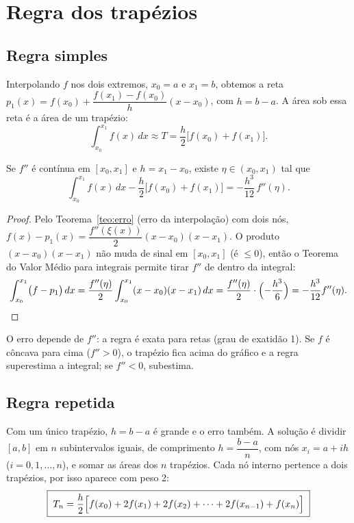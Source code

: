 \section{Regra dos trapézios}

\subsection{Regra simples}

Interpolando $f$ nos dois extremos, $x_0=a$ e $x_1=b$, obtemos a reta
$p_1(x)=f(x_0)+\dfrac{f(x_1)-f(x_0)}{h}(x-x_0)$, com $h=b-a$. A área sob essa reta é a área
de um trapézio:
\[
\int_{x_0}^{x_1}f(x)\,dx\approx T=\frac{h}{2}\bigl[f(x_0)+f(x_1)\bigr].
\]

\begin{teorema}\label{teo:errotrap}
Se $f''$ é contínua em $[x_0,x_1]$ e $h=x_1-x_0$, existe $\eta\in(x_0,x_1)$ tal que
\[
\int_{x_0}^{x_1}f(x)\,dx-\frac{h}{2}\bigl[f(x_0)+f(x_1)\bigr]=-\frac{h^3}{12}\,f''(\eta).
\]
\end{teorema}

\begin{proof}
Pelo Teorema~\ref{teo:erro} (erro da interpolação) com dois nós,
$f(x)-p_1(x)=\dfrac{f''(\xi(x))}{2}(x-x_0)(x-x_1)$. O produto $(x-x_0)(x-x_1)$ não muda de
sinal em $[x_0,x_1]$ (é $\le0$), então o Teorema do Valor Médio para integrais permite tirar
$f''$ de dentro da integral:
\[
\int_{x_0}^{x_1}\bigl(f-p_1\bigr)\,dx=\frac{f''(\eta)}{2}\int_{x_0}^{x_1}(x-x_0)(x-x_1)\,dx
=\frac{f''(\eta)}{2}\cdot\Bigl(-\frac{h^3}{6}\Bigr)=-\frac{h^3}{12}f''(\eta).
\qedhere
\]
\end{proof}

O erro depende de $f''$: a regra é exata para retas (grau de exatidão 1). Se $f$ é côncava
para cima ($f''>0$), o trapézio fica acima do gráfico e a regra superestima a integral; se
$f''<0$, subestima.

\subsection{Regra repetida}

Com um único trapézio, $h=b-a$ é grande e o erro também. A solução é dividir $[a,b]$ em $n$
subintervalos iguais, de comprimento $h=\dfrac{b-a}{n}$, com nós $x_i=a+ih$
($i=0,1,\dots,n$), e somar as áreas dos $n$ trapézios. Cada nó interno pertence a dois
trapézios, por isso aparece com peso 2:
\[
\boxed{\;T_n=\frac{h}{2}\Bigl[f(x_0)+2f(x_1)+2f(x_2)+\dots+2f(x_{n-1})+f(x_n)\Bigr]\;}
\]

